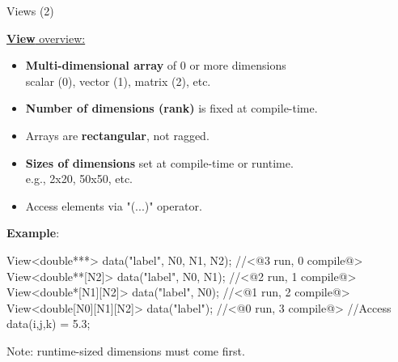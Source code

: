 
\begin{frame}[fragile]{Views (2)}

  \ul{\textbf{View} overview:}

  \begin{itemize}
    \item{\textbf{Multi-dimensional array} of 0 or more dimensions \\
          \hspace{20pt}scalar (0), vector (1), matrix (2), etc.}
    \item{\textbf{Number of dimensions (rank)} is fixed at compile-time.}
    \item{Arrays are \textbf{rectangular}, not ragged.}
    \item{\textbf{Sizes of dimensions} set at compile-time or runtime. \\
          \hspace{20pt}e.g., 2x20, 50x50, etc.}
    \item{Access elements via "(...)" operator.}
  \end{itemize}

  \pause
  \vspace{-3pt}

  \textbf{Example}:
  \vspace{-3pt}
  \begin{code}[keywords={double,View}]
View<double***> data("label", N0, N1, N2); //<@3 run, 0 compile@>
View<double**[N2]> data("label", N0, N1);  //<@2 run, 1 compile@>
View<double*[N1][N2]> data("label", N0);   //<@1 run, 2 compile@>
View<double[N0][N1][N2]> data("label");    //<@0 run, 3 compile@>
//Access
data(i,j,k) = 5.3;
  \end{code}

  \vspace{-1pt}
  Note: runtime-sized dimensions must come first.

\end{frame}


